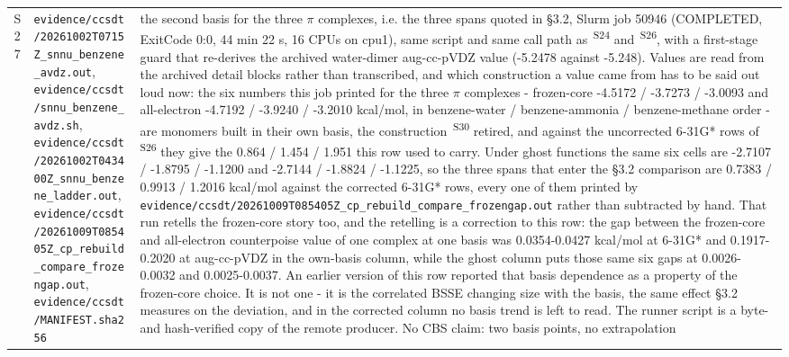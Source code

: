 \documentclass[11pt]{article}
\newcommand{\prov}[1]{\textsuperscript{\,#1}}
\begin{document}
\begin{longtable}{c>{\raggedright\arraybackslash}p{}>{\raggedright\arraybackslash}p{}}
S27 & \texttt{evidence/\allowbreak{}ccsdt/\allowbreak{}20261002T0715Z\_\allowbreak{}snnu\_\allowbreak{}benzene\_\allowbreak{}avdz.out}, \texttt{evidence/\allowbreak{}ccsdt/\allowbreak{}snnu\_\allowbreak{}benzene\_\allowbreak{}avdz.sh}, \texttt{evidence/\allowbreak{}ccsdt/\allowbreak{}20261002T043400Z\_\allowbreak{}snnu\_\allowbreak{}benzene\_\allowbreak{}ladder.out}, \texttt{evidence/\allowbreak{}ccsdt/\allowbreak{}20261009T085405Z\_\allowbreak{}cp\_\allowbreak{}rebuild\_\allowbreak{}compare\_\allowbreak{}frozengap.out}, \texttt{evidence/\allowbreak{}ccsdt/\allowbreak{}MANIFEST.sha256} & the second basis for the three $\pi$ complexes, i.e. the three spans quoted in \S{}3.2, Slurm job 50946 (COMPLETED, ExitCode 0:0, 44 min 22 s, 16 CPUs on cpu1), same script and same call path as \prov{S24} and \prov{S26}, with a first-stage guard that re-derives the archived water-dimer aug-cc-pVDZ value (-5.2478 against -5.248). Values are read from the archived detail blocks rather than transcribed, and which construction a value came from has to be said out loud now: the six numbers this job printed for the three $\pi$ complexes - frozen-core -4.5172 / -3.7273 / -3.0093 and all-electron -4.7192 / -3.9240 / -3.2010 kcal/mol, in benzene-water / benzene-ammonia / benzene-methane order - are monomers built in their own basis, the construction \prov{S30} retired, and against the uncorrected 6-31G* rows of \prov{S26} they give the 0.864 / 1.454 / 1.951 this row used to carry. Under ghost functions the same six cells are -2.7107 / -1.8795 / -1.1200 and -2.7144 / -1.8824 / -1.1225, so the three spans that enter the \S{}3.2 comparison are 0.7383 / 0.9913 / 1.2016 kcal/mol against the corrected 6-31G* rows, every one of them printed by \texttt{evidence/\allowbreak{}ccsdt/\allowbreak{}20261009T085405Z\_\allowbreak{}cp\_\allowbreak{}rebuild\_\allowbreak{}compare\_\allowbreak{}frozengap.out} rather than subtracted by hand. That run retells the frozen-core story too, and the retelling is a correction to this row: the gap between the frozen-core and all-electron counterpoise value of one complex at one basis was 0.0354-0.0427 kcal/mol at 6-31G* and 0.1917-0.2020 at aug-cc-pVDZ in the own-basis column, while the ghost column puts those same six gaps at 0.0026-0.0032 and 0.0025-0.0037. An earlier version of this row reported that basis dependence as a property of the frozen-core choice. It is not one - it is the correlated BSSE changing size with the basis, the same effect \S{}3.2 measures on the deviation, and in the corrected column no basis trend is left to read. The runner script is a byte- and hash-verified copy of the remote producer. No CBS claim: two basis points, no extrapolation \\

\end{longtable}
\end{document}
